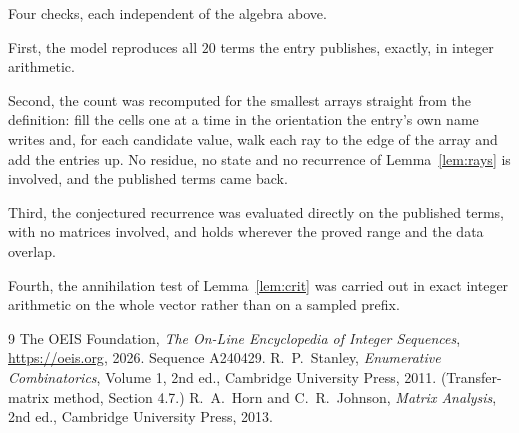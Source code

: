 \documentclass[11pt,a4paper]{article}
\theoremstyle{plain}
\theoremstyle{definition}
\begin{document}
Four checks, each independent of the algebra above.

First, the model reproduces all $20$ terms the entry publishes, exactly, in integer
arithmetic.

Second, the count was recomputed for the smallest arrays straight from the definition: fill the
cells one at a time in the orientation the entry's own name writes and, for each candidate
value, walk each ray to the edge of the array and add the entries up. No residue, no state and
no recurrence of Lemma~\ref{lem:rays} is involved, and the published terms came back.

Third, the conjectured recurrence was evaluated directly on the published terms, with no
matrices involved, and holds wherever the proved range and the data overlap.

Fourth, the annihilation test of Lemma~\ref{lem:crit} was carried out in exact integer
arithmetic on the whole vector rather than on a sampled prefix.

\begin{thebibliography}{9}
 The OEIS Foundation, \emph{The On-Line Encyclopedia of Integer
Sequences}, \url{https://oeis.org}, 2026. Sequence A240429.
 R.~P.~Stanley, \emph{Enumerative Combinatorics}, Volume 1, 2nd ed.,
Cambridge University Press, 2011. (Transfer-matrix method, Section 4.7.)
 R.~A.~Horn and C.~R.~Johnson, \emph{Matrix Analysis}, 2nd ed., Cambridge
University Press, 2013.
\end{thebibliography}
\end{document}

